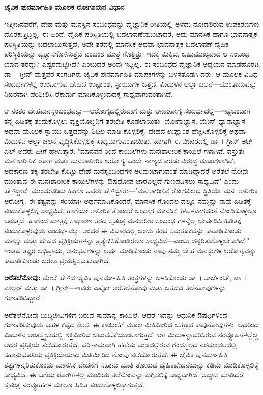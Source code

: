 \textbf{ಜೈವಿಕ ಪುನರ್ಮಾಹಿತಿ ಮೂಲಕ ರೋಗಶಮನ ವಿಧಾನ} 

ಇತ್ತೀಚಿನವರೆಗೆ, ದೇಹ ಮತ್ತು ಮನಸ್ಸಿನ ಸಂಬಂಧವನ್ನು ವೈಜ್ಞಾನಿಕ ರೀತಿಯಲ್ಲಿ ಅಳೆದು ನೋಡಲಿರುವ ಉಪಕರಣಗಳು ದೊರಕುತ್ತಿದ್ದಿಲ್ಲ. ಈ ಹಿಂದೆ, ದೈಹಿಕ ಪರಿಸ್ಥಿತಿಯಲ್ಲಿ ಬದಲಾವಣೆಯುಂಟಾದರೆ, ಅದು ಮಾನಸಿಕ ಹಾಗೂ ಭಾವನಾತ್ಮಕ ಪರಿಸ್ಥಿತಿಯನ್ನು ಬದಲಾಯಿಸುತ್ತದೆ; ಅದೇ ತರದಲ್ಲಿ ಮಾನಸಿಕ ಅಥವಾ ಭಾವನಾತ್ಮಕ ಬದಲಾವಣೆ ದೈಹಿಕ ಪರಿಸ್ಥಿತಿಯನ್ನು ವ್ಯತ್ಯಾಸಗೊಳಿಸುತ್ತದೆ ಎಂಬಂಶ ಮಾತ್ರ ಗೊತ್ತಿತ್ತು. ಇದಕ್ಕೆ ಮಿಕ್ಕಿದ, ಬಹುಮುಖ್ಯವಾದ ಆ ಸಂಬಂಧ ಯಾವ ತರದ್ದು? ಎಷ್ಟರಮಟ್ಟಿಗಿದೆ? ಎಂಬುದರ ಅರಿವು ಇದ್ದಿಲ್ಲ. ಈ ಸಂಬಂಧದ ವೈಜ್ಞಾನಿಕ ಅಧ್ಯಯನ ಮಾಡಹೊರಟ ಡಾ~। ಗ್ರೀನ್ ಮತ್ತವರ ಸಂಗಡಿಗರು ಜೈವಿಕ ಪುನರ್ಮಾಹಿತಿ ಮಾಪಕಗಳನ್ನು  ಬಳಸತೊಡಗಿ ದರು. ಆ ಮೂಲಕ ವಿವಿಧ ಸಂದರ್ಭಗಳಲ್ಲಿ ಉಂಟಾಗುವ ದೇಹದ ಉಷ್ಣಾಂಶ, ಸ್ನಾಯುಗಳ ಒತ್ತಡ, ಮಿದುಳಿನ ಅಲ್ಫಾ ಚಲನೆ—ಮುಂತಾದುವನ್ನು ನಿಖರವಾಗಿ ಪರಿಶೀಲಿಸಿ ರೆಕಾರ್ಡು ಮಾಡಿಕೊಳ್ಳುವುದಕ್ಕೆ ಸಾಧ್ಯವಾಗುವಂತಾಗಿದೆ.

ಆ ನಂತರ ದೇಹಮನಸ್ಸಂಬಂಧವನ್ನು—ಆರೋಗ್ಯದಲ್ಲಿರುವಾಗ ಮತ್ತು ಅನಾರೋಗ್ಯ ಸಂದರ್ಭದಲ್ಲಿ—ಇಷ್ಟಬಂದಾಗ ತನ್ನ ಹಿಡಿತಕ್ಕೆ ತಂದುಕೊಳ್ಳಲು ವ್ಯಕ್ತಿಯೊಬ್ಬನಿಗೆ ತರಬೇತಿ ಕೊಡಲಾಯಿತು. ಯೋಗಾಭ್ಯಾಸ, ಯೆುನ್ ಧ್ಯಾನಾಭ್ಯಾಸ ಅಥವಾ  ಮೂಲಕ ಸ್ನಾಯು ಒತ್ತಡವನ್ನು ಶಿಥಿಲ ಮಾಡಿ ಕೊಳ್ಳಲಿಕ್ಕೆ, ದೇಹದ ಉಷ್ಣಾಂಶ ಹೆಚ್ಚಿಸಿಕೊಳ್ಳಲಿಕ್ಕೆ ಅಥವಾ ಮಿದುಳಿನ ಅಲ್ಫಾ ಚಲನೆ ವೃದ್ಧಿಸಿಕೊಳ್ಳಲಿಕ್ಕೆ ಸಾಧ್ಯವಾಗುವಂತಾಯಿತು. ಹಾಗಾಗಿ ಈ ವಿಚಾರದಲ್ಲಿ ಡಾ~। ಗ್ರೀನ್ ಅಟ್​ಎಲ್ ಅವರು ಹೀಗೆ ಹೇಳುತ್ತಾರೆ: "ಮಾನವನ  ರಿಂದ  ಕಾಯಿಲೆಗಳು ಮನಃಶಾರೀರಿಕ ಕಾಯಿಲೆ  ಗಳಾಗಿವೆ. ವಸ್ತುತಃ ಮನಃಶಾರೀರಿಕ ರೋಗ ಮತ್ತು ಮನಃಶಾರೀರಿಕ ಆರೋಗ್ಯ ಒಂದೇ ನಾಣ್ಯದ ಎರಡು ವಿರುದ್ಧ ಮುಖಗಳಾಗಿವೆ. ಆದಕಾರಣ ತಕ್ಕ ತರಬೇತಿ ಕೊಟ್ಟು ದೇಹ ಮನಸ್ಸಂಬಂಧಗಳ ಅರಿವುಂಟಾಗುವಂತೆ ಮಾಡಿದ್ದಾದರೆ ಅರೆತಲೆ ನೋವು ಮುಂತಾದ ಈ ಮನಃಶಾರೀರಿಕ ಕಾಯಿಲೆಗಳನ್ನು ಔಷಧೋಪ ಚಾರವಿಲ್ಲದೆ ಗುಣಪಡಿಸಲು ಸಾಧ್ಯವಿದೆ" ಎಂದು ಹೇಳಿದ್ದಾರೆ. ಮುಂದುವರಿದು ಹೀಗೂ ಅವರು ಹೇಳಿದ್ದಾರೆ:—'ಮನಃಶಾರೀರಿಕ ರೋಗವಿಲ್ಲದ ಸ್ಥಿತಿಯೇ ಮನಃ ಶಾರೀರಿಕ ಆರೋಗ್ಯ. ಈ ತತ್ವವನ್ನು ಸರಿಯಾಗಿ ಅರ್ಥಮಾಡಿಕೊಂಡರೆ, ಮಾನಸಿಕ ಗೊಂದಲ ದಲ್ಲೂ ನಮ್ಮನ್ನು ನಾವು ಹಿಡಿತಕ್ಕೆ ತಂದುಕೊಳ್ಳಲಿಕ್ಕೆ ಸಾಧ್ಯವಿದೆ. ಹಾಗೆಯೇ ಶಾರೀರಿಕ ತೊಂದರೆ ಬಂದಾಗ ಮಾನಸಿಕ ಕಳವಳವಾಗದಂತೆ ನೋಡಿಕೊಳ್ಳಲೂ ಬರುತ್ತದೆ. ಹಾಗೆಂದ ಮಾತ್ರಕ್ಕೆ ಸಾಧಾರಣ ತರದ ಸ್ವತಂತ್ರ ಮನಃಶರೀರ ಸಂಬಂಧ ಗಳನ್ನೆಲ್ಲ ಬೇರ್ಪಡಿಸಿ ಹಿಡಿತಕ್ಕೆ ತಂದುಕೊಳ್ಳುವುದು ಎಂದರ್ಥವಲ್ಲ. ಅಂದರೆ ಈ ವಿಚಾರದಲ್ಲಿ ಒಂದು ತರದ ಸಮತೂಕವನ್ನು ಕಾಪಾಡಿಕೊಂಡು ಮನಸ್ಸು ಮತ್ತು ದೇಹದ ಪ್ರತಿಕ್ರಿಯೆಗಳನ್ನು ಪ್ರತ್ಯೇಕಿಸಿಕೊಂಡಿರಲೂ ಸಾಧ್ಯವಿದೆ—ಎಂಬು ದನ್ನರಿತುಕೊಳ್ಳಬೇಕಾಗಿದೆ." ಇಂತಹ ತಜ್ಞರ ಅಭಿಪ್ರಾಯ, ಅನುಭವಗಳನ್ನು ಅರ್ಥ ಮಾಡಿಕೊಂಡು ನಾವು ನಮ್ಮ ದೇಹ ಮನಸ್ಸುಗಳ ಆರೋಗ್ಯವನ್ನು ಕಾಪಾಡಿಕೊಂಡು ಬರಲು ಪ್ರಯತ್ನಿಸಬಹುದಾಗಿದೆ.

\textbf{ಅರೆತಲೆನೋವು:} ಮೇಲೆ ಹೇಳಿದ ಜೈವಿಕ ಪುನರ್ಮಾಹಿತಿ ತಂತ್ರಗಳನ್ನು ಬಳಸಿಕೊಂಡು ಡಾ~। ಸಾರ್ಜೆಂಟ್, ಡಾ~। ವಾಲ್ಟರ್ ಮತ್ತು ಡಾ~। ಗ್ರೀನ್​—ಇವರು ಎಷ್ಟೋ ಅರೆತಲೆನೋವು ಮತ್ತು ಒತ್ತಡದ ತಲೆನೋವುಗಳನ್ನು ಗುಣಪಡಿಸಿದ್ದಾರೆ.

ಅರೆತಲೆನೋವು ಬುದ್ಧಿಜೀವಿಗಳಿಗೆ ಬರುವ ಸಾಮಾನ್ಯ ಕಾಯಿಲೆ. ಆದರೆ ಇದನ್ನು ಆಧುನಿಕ ಔಷಧಿಗಳಿಂದ ಗುಣಪಡಿಸುವುದು ಬಹಳ ಕಷ್ಟದ ಕೆಲಸ. ಈ ಕಾಯಿಲೆಗೆ ಮೂಲ ಮಿತಿಮೀರಿದ ಒತ್ತಡದ ಕಾವುನೋವುಗಳು. ಅದರಿಂದ ಮಿದುಳಿನ ಅಂತಸ್ತ್ವಚೆಯಲ್ಲಿ ಶಕ್ತಿಮೀರಿದ ಚಟುವಟಿಕೆಯುಂಟಾಗುತ್ತದೆ. ಆಗ ಮಿದುಳನ್ನಾವರಿಸಿರುವ ನರವ್ಯೂಹಗಳಲ್ಲೆಲ್ಲ ಅದರ ಪ್ರತಿಕ್ರಿಯೆ ತಲೆದೋರುತ್ತದೆ. ಪರಿಣಾಮವಾಗಿ ಹಣೆಯ ಬುಡದಲ್ಲಿರುವ ಗಂಡಸ್ಥಲದ ನರಮಂಡಲದಲ್ಲಿ ಸಹಾನುಭೂತಿಯ ಪ್ರತಿಕ್ರಿಯೆಯಾದ ಮಿತಿಮೀರಿದ ನೋವು ತಲೆದೋರುತ್ತದೆ. ಈ ಜೈವಿಕ ಪುನರ್ಮಾಹಿತಿ ತತ್ವಗಳನ್ನರಿತುಕೊಂಡು ಮಾನಸಿಕ ವೇದನೆಗೆ ಸಹಾನು ಭೂತಿ ತೋರುವ ದೈಹಿಕವೇದನೆಯನ್ನು ಕಡಿಮೆ ಮಾಡಿಕೊಳ್ಳಲಿಕ್ಕೆ ಸಾಧ್ಯವಿದೆ. ಈ ಬಗೆಯ  ರೋಗಿಗಳಲ್ಲಿ  ಮಂದಿಯ ತಲೆನೋವನ್ನು ಕುಗ್ಗಿಸಲಿಕ್ಕೆ ಸಾಧ್ಯವಾಗಿದೆ. ಅಭ್ಯಾಸ ಮಾಡಿದರೆ ಸ್ವತಂತ್ರ ನರವ್ಯೂಹಗಳ ಮೇಲೂ ಹಿಡಿತ ತಂದುಕೊಳ್ಳಲಿಕ್ಕಾಗುತ್ತದೆ.

